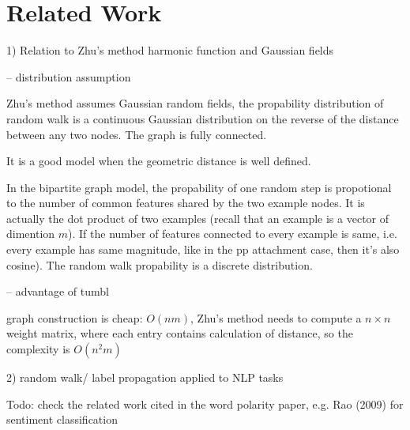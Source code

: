 \section{Related Work}

1) Relation to Zhu's method harmonic function and Gaussian fields

-- distribution assumption

Zhu's method assumes Gaussian random fields, the propability distribution of random
walk is a continuous Gaussian distribution on the reverse of the distance
between any two nodes. The graph is fully connected. 


It is a good model when the geometric distance is well defined.

In the bipartite graph model, the propability of one random step is propotional to the number of
common features shared by the two example nodes. It is actually the dot product
of two examples (recall that an example is a vector of dimention $m$).
If the number of features connected to every example 
is same, i.e. every example has same magnitude, like in the pp attachment case,
then it's also cosine). The random walk propability is a discrete distribution.

-- advantage of tumbl

graph construction is cheap: $O(nm)$, Zhu's method needs
to compute a $n \times n$ weight matrix, where each entry contains calculation
of distance, so the complexity is $O(n^2m)$

2) random walk/ label propagation applied to NLP tasks

Todo: check the related work cited in the word polarity paper, 
 e.g. Rao (2009) for sentiment classification


